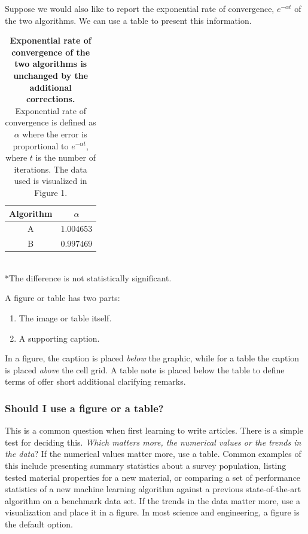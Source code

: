 \documentclass[]{article}
\begin{document}
Suppose we would also like to report the exponential rate of convergence, $e^{-\alpha t}$ of the two algorithms. We can use a table to present this information.


\begin{table}[hb!]
    \centering
    \caption{{\bf Exponential rate of convergence of the two algorithms is unchanged by the additional corrections.} Exponential rate of convergence is defined as $\alpha$ where the error is proportional to $e^{-\alpha t}$, where $t$ is the number of iterations. The data used is visualized in Figure 1.}

    \begin{tabular}{c|c}
        Algorithm & $\alpha$ \\
        \hline
        A & $1.004653$ \\
        B & $0.997469$ \\
    \end{tabular} \\

    *The difference is not statistically significant.
\end{table}


A figure or table has two parts:
\begin{enumerate}
    \item The image or table itself.
    \item A supporting caption.
\end{enumerate}
In a figure, the caption is placed \emph{below} the graphic, while for a table the caption is placed \emph{above} the cell grid. A table note is placed below the table to define terms of offer short additional clarifying remarks.


\subsubsection{Should I use a figure or a table?}
This is a common question when first learning to write articles. There is a simple test for deciding this. \emph{Which matters more, the numerical values or the trends in the data}? If the numerical values matter more, use a table. Common examples of this include presenting summary statistics about a survey population, listing tested material properties for a new material, or comparing a set of performance statistics of a new machine learning algorithm against a previous state-of-the-art algorithm on a benchmark data set. If the trends in the data matter more, use a visualization and place it in a figure. In most science and engineering, a figure is the default option.
\end{document}
